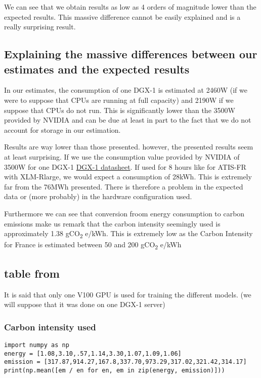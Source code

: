 \documentclass[11pt]{article}
\begin{document}
We can see that we obtain results as low as 4 orders of magnitude
lower than the expected results. This massive difference cannot be
easily explained and is a really surprising result.

\subsection{Explaining the massive differences between our estimates and the expected results}
\label{sec:org25188cf}

In our estimates, the consumption of one DGX-1 is estimated at
2460W (if we were to suppose that CPUs are running at full capacity)
and 2190W if we suppose that CPUs do not run. This is significantly lower than the 3500W provided by NVIDIA
and can be due at least in part to the fact that we do not account for
storage in our estimation.

Results are way lower than those presented. however, the presented
results seem at least surprising. If we use the consumption value
provided by NVIDIA of 3500W for one DGX-1 \href{https://www.nvidia.com/content/dam/en-zz/Solutions/Data-Center/dgx-1/dgx-1-rhel-centos-datasheet-update-r2\_Updates\_NV\_web\_fr\_FR.pdf}{DGX-1 datasheet}. If used for
8 hours like for ATIS-FR with XLM-Rlarge, we would expect a
consumption of 28kWh. This is extremely far from the 76MWh
presented. There is therefore a problem in the expected data or (more
probably) in the hardware configuration used. 

Furthermore we can see that conversion froom energy consumption to
carbon emissions make us remark that the carbon intensity seemingly
used is approximately 1.38 gCO\textsubscript{2} e/kWh. This is extremely low as the
Carbon Intensity for France is estimated between 50 and 200 gCO\textsubscript{2} e/kWh

\subsection{table from \cite{Cattan2022usability}}
\label{sec:org29dc08c}

It is said that only one V100 GPU is used for training the different
models. (we will suppose that it was done on one DGX-1 server)

\subsubsection{Carbon intensity used}
\label{sec:org0b93844}
\begin{verbatim}
import numpy as np
energy = [1.08,3.10,.57,1.14,3.30,1.07,1.09,1.06]
emission = [317.87,914.27,167.8,337.70,973.29,317.02,321.42,314.17]
print(np.mean([em / en for en, em in zip(energy, emission)]))
\end{verbatim}
\end{document}
